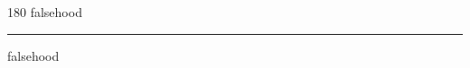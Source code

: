 
\begin{frame}
\begin{center}
\begin{turn}{180}
{\fontsize{2.5cm}{1em}\selectfont falsehood}
\end{turn}
\vspace{1em}\par  
\hrule
\vspace{1em}\par  
{\fontsize{2.5cm}{1em}\selectfont falsehood}
\end{center}
\end{frame}
